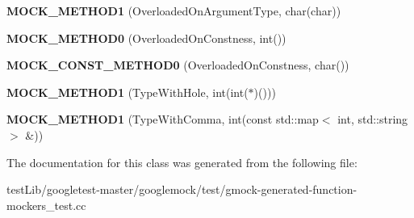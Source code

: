 \begin{DoxyCompactItemize}
{\bfseries M\+O\+C\+K\+\_\+\+M\+E\+T\+H\+O\+D1} (Overloaded\+On\+Argument\+Type, char(char))
\item 
\mbox{\label{classtesting_1_1gmock__generated__function__mockers__test_1_1MockFoo_a291ff46b043d00d0f0acb081c5c36f2e}} 
{\bfseries M\+O\+C\+K\+\_\+\+M\+E\+T\+H\+O\+D0} (Overloaded\+On\+Constness, int())
\item 
\mbox{\label{classtesting_1_1gmock__generated__function__mockers__test_1_1MockFoo_aa0da575ad3061850662c5f401ddb30c2}} 
{\bfseries M\+O\+C\+K\+\_\+\+C\+O\+N\+S\+T\+\_\+\+M\+E\+T\+H\+O\+D0} (Overloaded\+On\+Constness, char())
\item 
\mbox{\label{classtesting_1_1gmock__generated__function__mockers__test_1_1MockFoo_a33077a71c1c5178c25b0a4aa099d5f2c}} 
{\bfseries M\+O\+C\+K\+\_\+\+M\+E\+T\+H\+O\+D1} (Type\+With\+Hole, int(int($\ast$)()))
\item 
\mbox{\label{classtesting_1_1gmock__generated__function__mockers__test_1_1MockFoo_a3774adcc0155dd4c3b5fd790a6f40261}} 
{\bfseries M\+O\+C\+K\+\_\+\+M\+E\+T\+H\+O\+D1} (Type\+With\+Comma, int(const std\+::map$<$ int, std\+::string $>$ \&))
\end{DoxyCompactItemize}


The documentation for this class was generated from the following file\+:\begin{DoxyCompactItemize}
\item 
test\+Lib/googletest-\/master/googlemock/test/gmock-\/generated-\/function-\/mockers\+\_\+test.\+cc\end{DoxyCompactItemize}
